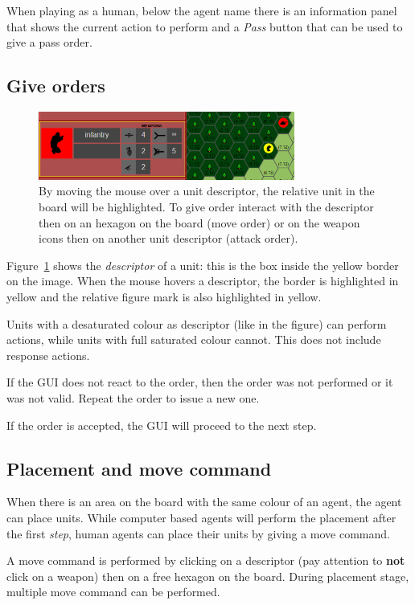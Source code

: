 \documentclass[a4paper]{article}
\begin{document}
	When playing as a human, below the agent name there is an information panel that shows the current action to perform and a \textit{Pass} button that can be used to give a pass order.

	\subsection{Give orders}

	\begin{figure}[ht!]
		\centering
		\includegraphics[width=0.75\textwidth]{interactive.png}
		\caption{By moving the mouse over a unit descriptor, the relative unit in the board will be highlighted. To give order interact with the descriptor then on an hexagon on the board (move order) or on the weapon icons then on another unit descriptor (attack order).}
		\label{interactive}
	\end{figure}

	Figure~\ref{interactive} shows the \textit{descriptor} of a unit: this is the box inside the yellow border on the image. When the mouse hovers a descriptor, the border is highlighted in yellow and the relative figure mark is also highlighted in yellow.

	Units with a desaturated colour as descriptor (like in the figure) can perform actions, while units with full saturated colour cannot. This does not include response actions.

	If the GUI does not react to the order, then the order was not performed or it was not valid. Repeat the order to issue a new one.

	If the order is accepted, the GUI will proceed to the next step.

	\subsection{Placement and move command}

	When there is an area on the board with the same colour of an agent, the agent can place units. While computer based agents will perform the placement after the first \textit{step}, human agents can place their units by giving a move command.

	A move command is performed by clicking on a descriptor (pay attention to \textbf{not} click on a weapon) then on a free hexagon on the board. During placement stage, multiple move command can be performed.
\end{document}
